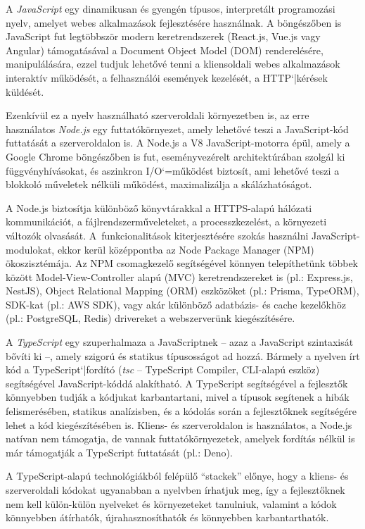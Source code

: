 A \emph{JavaScript} egy dinamikusan és gyengén típusos, interpretált programozási nyelv, amelyet webes alkalmazások fejlesztésére használnak. A böngészőben is JavaScript fut legtöbbször modern keretrendszerek (React.js, Vue.js vagy Angular) támogatásával a Document Object Model (DOM) renderelésére, manipulálására, ezzel tudjuk lehetővé tenni a kliensoldali webes alkalmazások interaktív működését, a felhasználói események kezelését, a HTTP`|kérések küldését.

Ezenkívül ez a nyelv használható szerveroldali környezetben is, az erre használatos \emph{Node.js} egy futtatókörnyezet, amely lehetővé teszi a JavaScript-kód futtatását a szerveroldalon is. A Node.js a V8 JavaScript-motorra épül, amely a Google Chrome böngészőben is fut, eseményvezérelt architektúrában szolgál ki függvényhívásokat, és aszinkron I/O`=működést biztosít, ami lehetővé teszi a blokkoló műveletek nélküli működést, maximalizálja a skálázhatóságot.\cite{Node}

A Node.js biztosítja különböző könyvtárakkal a HTTPS-alapú hálózati kommunikációt, a fájlrendszerműveleteket, a processzkezelést, a környezeti változók olvasását. A~funkcionalitások kiterjesztésére szokás használni JavaScript-modulokat, ekkor kerül középpontba az Node Package Manager (NPM) ökoszisztémája. Az NPM csomagkezelő segítségével könnyen telepíthetünk többek között Model-View-Controller alapú (MVC) keretrendszereket is (pl.: Express.js, NestJS), Object Relational Mapping (ORM) eszközöket (pl.: Prisma, TypeORM), SDK-kat (pl.: AWS SDK), vagy akár különböző adatbázis- és cache kezelőkhöz (pl.: PostgreSQL, Redis) drivereket a webszerverünk kiegészítésére.

A \emph{TypeScript} egy szuperhalmaza a JavaScriptnek -- azaz a JavaScript szintaxisát bővíti ki --, amely szigorú és statikus típusosságot ad hozzá. Bármely a nyelven írt kód a TypeScript`|fordító (\emph{tsc} -- TypeScript Compiler, CLI-alapú eszköz) segítségével JavaScript-kóddá alakítható. A TypeScript segítségével a fejlesztők könnyebben tudják a kódjukat karbantartani, mivel a típusok segítenek a hibák felismerésében, statikus analízisben, és a kódolás során a fejlesztőknek segítségére lehet a kód kiegészítésében is. Kliens- és szerveroldalon is használatos, a Node.js natívan nem támogatja, de vannak futtatókörnyezetek, amelyek fordítás nélkül is már támogatják a TypeScript futtatását (pl.: Deno).

A TypeScript-alapú technológiákból felépülő ``stackek'' előnye, hogy a kliens- és szerveroldali kódokat ugyanabban a nyelvben írhatjuk meg, így a fejlesztőknek nem kell külön-külön nyelveket és környezeteket tanulniuk, valamint a kódok könnyebben átírhatók, újrahasznosíthatók és könnyebben karbantarthatók.

